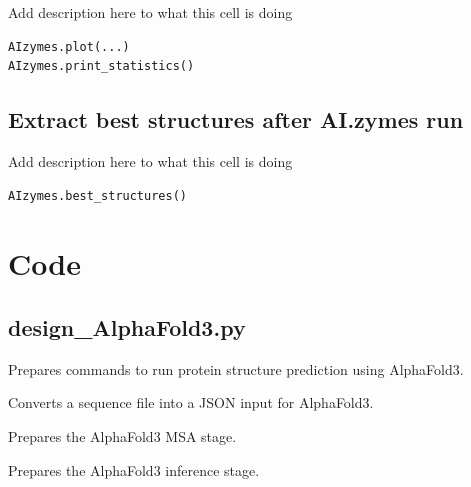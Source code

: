\documentclass[10pt]{extarticle}
\let\oldsection\section
\renewcommand{\section}[1]{\clearpage\oldsection{#1}}
\begin{document}
Add description here to what this cell is doing

\vspace*{0.5\baselineskip}
\begin{lstlisting}[basicstyle=\color{black}\fontsize{9}{11}\selectfont\ttfamily, frame=single, rulecolor=\color{black}, breaklines=true]
AIzymes.plot(...)          
AIzymes.print_statistics()               
\end{lstlisting}
\vspace*{0.5\baselineskip}

\subsection{Extract best structures after AI.zymes run}

Add description here to what this cell is doing

\vspace*{0.5\baselineskip}
\begin{lstlisting}[basicstyle=\color{black}\fontsize{9}{11}\selectfont\ttfamily, frame=single, rulecolor=\color{black}, breaklines=true]
AIzymes.best_structures()      
\end{lstlisting}
\vspace*{0.5\baselineskip}\section{Code}
\subsection{design\_AlphaFold3.py}
Prepares commands to run protein structure prediction using AlphaFold3.

\par\vspace*{0.5\baselineskip}
{
\begin{description}[noitemsep,topsep=0pt,parsep=0pt,labelwidth=5cm,leftmargin=!,labelindent=0pt,labelsep=0.2cm,itemsep=0pt]
\item[\textcolor{mpgAccentBlue!75!white}{seq\_to\_json()\dotfill}] Converts a sequence file into a JSON input for AlphaFold3.
\item[\textcolor{mpgAccentBlue!75!white}{prepare\_AlphaFold3\_MSA()\dotfill}] Prepares the AlphaFold3 MSA stage.
\item[\textcolor{mpgAccentBlue!75!white}{prepare\_AlphaFold3\_INF()\dotfill}] Prepares the AlphaFold3 inference stage.
\end{description}
}
\end{document}
